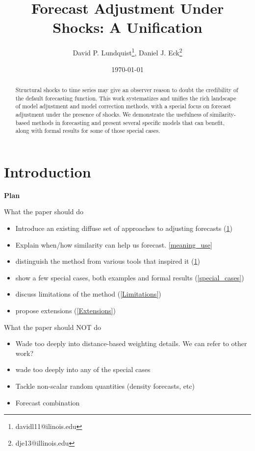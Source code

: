 \documentclass[11pt]{article}
\title{Forecast Adjustment Under Shocks: A Unification}
\author{David P. Lundquist\thanks{davidl11@ilinois.edu}, Daniel J. Eck\thanks{dje13@illinois.edu} }
\affil{Department of Statistics, University of Illinois at Urbana-Champaign}
\date{\today}
\theoremstyle{definition}
\begin{document}
\maketitle

\begin{abstract} 
Structural shocks to time series may give an observer reason to doubt the credibility of the default forecasting function.  This work systematizes and unifies the rich landscape of model adjustment and model correction methods, with a special focus on forecast adjustment under the presence of shocks.  We demonstrate the usefulness of similarity-based methods in forecasting and present several specific models that can benefit, along with formal results for some of those special cases.

\end{abstract}





\section{Introduction}\label{Introduction}

\textbf{Plan}

What the paper should do
\begin{itemize}
  \item Introduce an existing diffuse set of approaches to adjusting forecasts (\ref{Introduction})
  \item Explain when/how similarity can help us forecast. \ref{meaning_use}
  \item distinguish the method from various tools that inspired it (\ref{Introduction})
  \item show a few special cases, both examples and formal results (\ref{special_cases})
  \item discuss limitations of the method (\ref{Limitations})
  \item propose extensions (\ref{Extensions})
\end{itemize}

What the paper should NOT do

\begin{itemize}
  \item Wade too deeply into distance-based weighting details.  We can refer to other work?
  \item wade too deeply into any of the special cases
  \item Tackle non-scalar random quantities (density forecasts, etc)
  \item Forecast combination

\end{itemize}
\end{document}
